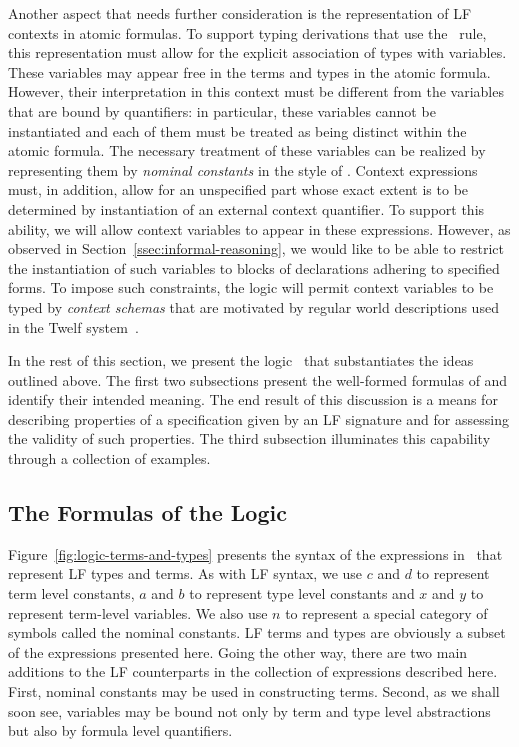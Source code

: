 Another aspect that needs further consideration is the representation of
LF contexts in atomic formulas.
%
To support typing derivations that use the
\canontermlam\ rule, this representation must allow for the explicit
association of types with variables.
%
These variables may appear free in the terms and types in the atomic
formula.
%
However, their interpretation in this context must be different from
the variables that are bound by quantifiers: in particular, these
variables cannot be instantiated and each of them must be treated as
being distinct within the atomic formula. 
%
The necessary treatment of these variables can be realized by
representing them by \emph{nominal constants} in the style of
\cite{gacek11ic,tiu06lfmtp}.
%
Context expressions must, in addition, allow for an unspecified part
whose exact extent is to be determined by instantiation of an external
context quantifier.
%
To support this ability, we will allow context variables to appear in
these expressions.
%
However, as observed in Section~\ref{ssec:informal-reasoning}, we
would like to be able to restrict the instantiation of such variables
to blocks of declarations adhering to specified forms.
%
To impose such constraints, the logic will permit context variables to
be typed by \emph{context schemas} that are motivated by regular world
descriptions used in the Twelf
system~\cite{Pfenning02guide,schurmann00phd}. 

In the rest of this section, we present the logic \logic\ that
substantiates the ideas outlined above.
%
The first two subsections present the well-formed formulas of \logic and
identify their intended meaning. 
%
The end result of this discussion is a means for describing properties
of a specification given by an LF signature and for assessing the
validity of such properties.
%
The third subsection illuminates this capability through a
collection of examples.

\subsection{The Formulas of the Logic}

Figure~\ref{fig:logic-terms-and-types} presents the syntax of the
expressions in \logic\ that represent LF types and terms.
%
As with LF syntax, we use $c$ and $d$ to represent term level
constants, $a$ and $b$ to represent type level constants and $x$ and
$y$ to represent term-level variables.
%
We also use $n$ to represent a special category of symbols called the
nominal constants.
%
LF terms and types are obviously a subset of the expressions presented
here.
%
Going the other way, there are two main additions to the LF
counterparts in the collection of expressions described here.
%
First, nominal constants may be used in constructing terms.
%
Second, as we shall soon see, variables may be bound not only by
term and type level abstractions but also by formula level
quantifiers.

